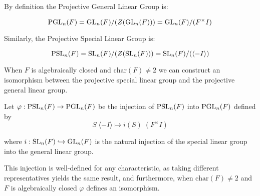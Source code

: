 By definition the Projective General Linear Group is:

\begin{equation}
    \operatorname{PGL}_n(F) = \operatorname{GL}_n(F) / (Z(\operatorname{GL}_n(F))) = \operatorname{GL}_n(F) / (F^\times I) 
\end{equation}

Similarly, the Projective Special Linear Group is:

\begin{equation}
    \operatorname{PSL}_n(F) = \operatorname{SL}_n(F) / (Z(\operatorname{SL}_n(F))) = \operatorname{SL}_n(F) / (\langle -I\rangle)
\end{equation}



When $F$ is algebraically closed and $\textrm{char}(F) \neq 2$ we can construct an isomorphism between the projective special linear group and the projective general linear group.

Let $\varphi : \operatorname{PSL}_n(F) \rightarrow \operatorname{PGL}_n(F)$ be the injection of $\operatorname{PSL}_n(F)$ into $\operatorname{PGL}_n(F)$ defined by
\[
 S \; \langle -I\rangle \mapsto i(S) \;  (F^\times I) 
\]

where $i : \operatorname{SL}_n(F) \hookrightarrow \operatorname{GL}_n(F)$ is the natural injection of the special linear group into the general linear group.

This injection is well-defined for any characteristic, as taking different representatives yields the same result, and furthermore, when $\textrm{char}(F) \ne 2$ and $F$ is algebraically closed $\varphi$ defines an isomorphism.


